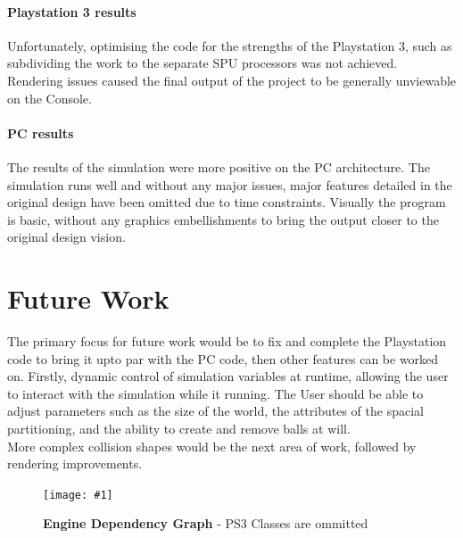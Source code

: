 \documentclass[conference]{acmsiggraph}
\newcommand{\figuremacroF}[4]{
	\begin{figure}[h] %
		\centering
		\texttt{[image: \#1]}
		\caption[#2]{\textbf{#2} - #3}
		\label{fig:#1}
	\end{figure}
}
\begin{document}
\paragraph{Playstation 3 results}
Unfortunately, optimising the code for the strengths of the Playstation 3, such as subdividing the work to the separate SPU processors was not achieved. Rendering issues caused the final output of the project to be generally unviewable on the Console.

\paragraph{PC results}
The results of the simulation were more positive on the PC architecture. The simulation runs well and without any major issues, major features detailed in the original design have been omitted due to time constraints. Visually the program is basic, without any graphics embellishments to bring the output closer to the original design vision.

\section{Future Work}
The primary focus for future work would be to fix and complete the Playstation code to bring it upto par with the PC code, then other features can be worked on. Firstly, dynamic control of simulation variables at runtime, allowing the user to interact with the simulation while it running. The User should be able to adjust parameters such as the  size of the world, the attributes of the spacial partitioning, and the ability to create and remove balls at will.\\
More complex collision shapes would be the next area of work, followed by rendering improvements.





\figuremacroF
{engineclasses}
{Engine Dependency Graph}
{PS3 Classes are ommitted}
{1.0}
\end{document}
